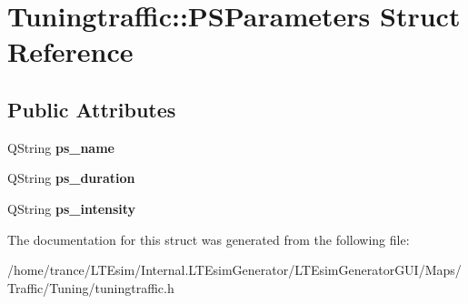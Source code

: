 \hypertarget{struct_tuningtraffic_1_1_p_s_parameters}{}\section{Tuningtraffic\+:\+:P\+S\+Parameters Struct Reference}
\label{struct_tuningtraffic_1_1_p_s_parameters}
\subsection*{Public Attributes}
\begin{DoxyCompactItemize}
\item 
Q\+String {\bfseries ps\+\_\+name}\hypertarget{struct_tuningtraffic_1_1_p_s_parameters_a9b06d1bcc30e88722cf911bc1245f178}{}\label{struct_tuningtraffic_1_1_p_s_parameters_a9b06d1bcc30e88722cf911bc1245f178}

\item 
Q\+String {\bfseries ps\+\_\+duration}\hypertarget{struct_tuningtraffic_1_1_p_s_parameters_a5fc9d90af2806d56339cab2ec6a34984}{}\label{struct_tuningtraffic_1_1_p_s_parameters_a5fc9d90af2806d56339cab2ec6a34984}

\item 
Q\+String {\bfseries ps\+\_\+intensity}\hypertarget{struct_tuningtraffic_1_1_p_s_parameters_a0a51503ac3908e00aeb6429bb3209b7c}{}\label{struct_tuningtraffic_1_1_p_s_parameters_a0a51503ac3908e00aeb6429bb3209b7c}

\end{DoxyCompactItemize}


The documentation for this struct was generated from the following file\+:\begin{DoxyCompactItemize}
\item 
/home/trance/\+L\+T\+Esim/\+Internal.\+L\+T\+Esim\+Generator/\+L\+T\+Esim\+Generator\+G\+U\+I/\+Maps/\+Traffic/\+Tuning/tuningtraffic.\+h\end{DoxyCompactItemize}
